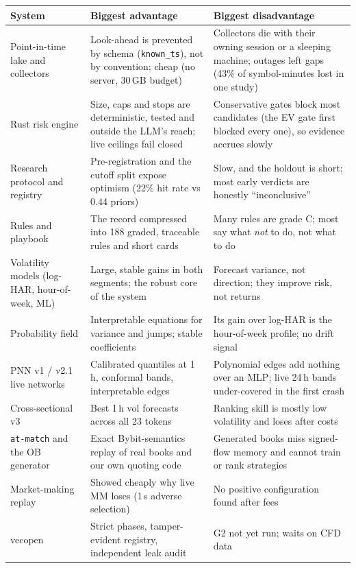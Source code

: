 \documentclass[10pt,a4paper]{article}
\begin{document}
\begin{table}[h]
\centering\small
\begin{tabularx}{\textwidth}{@{}p{3.0cm} L L@{}}
\toprule
System & Biggest advantage & Biggest disadvantage \\
\midrule
Point-in-time lake and collectors & Look-ahead is prevented by schema (\texttt{known\_ts}), not by convention; cheap (no server, 30\,GB budget) & Collectors die with their owning session or a sleeping machine; outages left gaps (43\% of symbol-minutes lost in one study) \\
Rust risk engine & Size, caps and stops are deterministic, tested and outside the LLM's reach; live ceilings fail closed & Conservative gates block most candidates (the EV gate first blocked every one), so evidence accrues slowly \\
Research protocol and registry & Pre-registration and the cutoff split expose optimism (22\% hit rate vs 0.44 priors) & Slow, and the holdout is short; most early verdicts are honestly ``inconclusive'' \\
Rules and playbook & The record compressed into 188 graded, traceable rules and short cards & Many rules are grade C; most say what \emph{not} to do, not what to do \\
Volatility models (log-HAR, hour-of-week, ML) & Large, stable gains in both segments; the robust core of the system & Forecast variance, not direction; they improve risk, not returns \\
Probability field & Interpretable equations for variance and jumps; stable coefficients & Its gain over log-HAR is the hour-of-week profile; no drift signal \\
PNN v1 / v2.1 live networks & Calibrated quantiles at 1\,h, conformal bands, interpretable edges & Polynomial edges add nothing over an MLP; live 24\,h bands under-covered in the first crash \\
Cross-sectional v3 & Best 1\,h vol forecasts across all 23 tokens & Ranking skill is mostly low volatility and loses after costs \\
\texttt{at-match} and the OB generator & Exact Bybit-semantics replay of real books and our own quoting code & Generated books miss signed-flow memory and cannot train or rank strategies \\
Market-making replay & Showed cheaply why live MM loses (1\,s adverse selection) & No positive configuration found after fees \\
vecopen & Strict phases, tamper-evident registry, independent leak audit & G2 not yet run; waits on CFD data \\

\end{tabularx}
\end{table}
\end{document}
